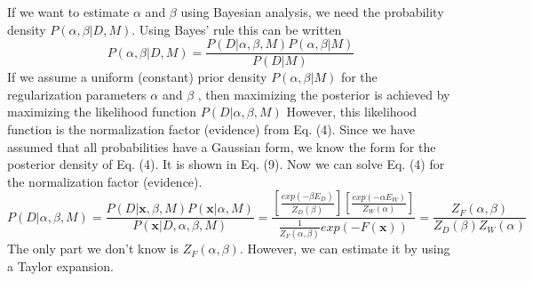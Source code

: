 \documentclass[a4paper, 12pt, english, parskip]{scrartcl}
\begin{document}
If we want to estimate $\alpha$ and $\beta$ using Bayesian analysis, we need the probability density $P(\alpha, \beta \vert D, M)$. Using Bayes' rule this can be written
\begin{equation}
    P(\alpha, \beta \vert D, M) = \frac{P(D \vert \alpha, \beta, M) P(\alpha, \beta \vert M)}{P(D \vert M)}
\end{equation}
If we assume a uniform (constant) prior density $P(\alpha, \beta \vert M)$ for the regularization parameters $\alpha$ and $\beta$ , then maximizing the posterior is achieved by maximizing the likelihood function $P(D \vert \alpha, \beta, M)$ However, this likelihood function is the normalization factor (evidence) from Eq. (4). Since we have assumed that all probabilities have a Gaussian form, we know the form for the posterior density of Eq. (4). It is shown in Eq. (9). Now we can solve Eq. (4) for the normalization factor (evidence).
\begin{equation}
    P(D \vert \alpha, \beta, M) = \frac{P(D \vert \boldsymbol{x}, \beta, M) P(\boldsymbol{x} \vert \alpha, M)}{P(\boldsymbol{x} \vert D, \alpha, \beta, M)} = \frac{\left[\frac{exp(-\beta E_D)}{Z_D(\beta)}\right] \left[\frac{exp(-\alpha E_W)}{Z_W(\alpha)}\right]}{\frac{1}{Z_F(\alpha, \beta)}exp(-F(\boldsymbol{x}))} = \frac{Z_F (\alpha, \beta)}{Z_D(\beta) Z_W(\alpha)}
\end{equation}
The only part we don't know is $Z_F(\alpha, \beta).$ However, we can estimate it by using a Taylor expansion.
\end{document}
